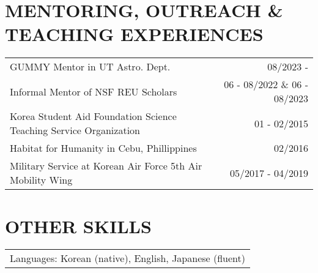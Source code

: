 \documentclass[letterpaper,10pt]{article}
\begin{document}


\section{\textbf{MENTORING, OUTREACH \& TEACHING EXPERIENCES}}
\begin{center}
\begin{tabular*}{0.97\textwidth}{l@{\extracolsep{\fill}}r}
  GUMMY Mentor in UT Astro. Dept. & 08/2023 - \\
  Informal Mentor of NSF REU Scholars & 06 - 08/2022 \& 06 - 08/2023\\
  Korea Student Aid Foundation Science Teaching Service Organization & 01 - 02/2015\\
  Habitat for Humanity in Cebu, Phillippines & 02/2016\\
  Military Service at Korean Air Force 5th Air Mobility Wing & 05/2017 - 04/2019\\
\end{tabular*}
\end{center}

\section{\textbf{OTHER SKILLS}}
\begin{center}
\begin{tabularx}{0.97\textwidth}{X}
  Languages: Korean (native), English, Japanese (fluent)\\
\end{tabularx}
\end{center}
\end{document}
